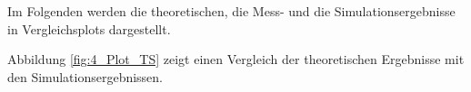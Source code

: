 \pgfmathsetmacro{\ImYtheoc}{\pgfplotsretval}
\of\dataTheoY
\pgfmathsetmacro{\ImYtheod}{\pgfplotsretval}
\of\dataTheoY
\pgfmathsetmacro{\ImYtheoe}{\pgfplotsretval}
\of\dataSimZ
\pgfmathsetmacro{\ReZsima}{\pgfplotsretval}
\of\dataSimZ
\pgfmathsetmacro{\ReZsimb}{\pgfplotsretval}
\of\dataSimZ
\pgfmathsetmacro{\ReZsimc}{\pgfplotsretval}
\of\dataSimZ
\pgfmathsetmacro{\ReZsimd}{\pgfplotsretval}
\of\dataSimZ
\pgfmathsetmacro{\ReZsime}{\pgfplotsretval}
\of\dataSimZ
\pgfmathsetmacro{\ImZsima}{\pgfplotsretval}
\of\dataSimZ
\pgfmathsetmacro{\ImZsimb}{\pgfplotsretval}
\of\dataSimZ
\pgfmathsetmacro{\ImZsimc}{\pgfplotsretval}
\of\dataSimZ
\pgfmathsetmacro{\ImZsimd}{\pgfplotsretval}
\of\dataSimZ
\pgfmathsetmacro{\ImZsime}{\pgfplotsretval}
\of\dataSimY
\pgfmathsetmacro{\ReYsima}{\pgfplotsretval}
\of\dataSimY
\pgfmathsetmacro{\ReYsimb}{\pgfplotsretval}
\of\dataSimY
\pgfmathsetmacro{\ReYsimc}{\pgfplotsretval}
\of\dataSimY
\pgfmathsetmacro{\ReYsimd}{\pgfplotsretval}
\of\dataSimY
\pgfmathsetmacro{\ReYsime}{\pgfplotsretval}
\of\dataSimY
\pgfmathsetmacro{\ImYsima}{\pgfplotsretval}
\of\dataSimY
\pgfmathsetmacro{\ImYsimb}{\pgfplotsretval}
\of\dataSimY
\pgfmathsetmacro{\ImYsimc}{\pgfplotsretval}
\of\dataSimY
\pgfmathsetmacro{\ImYsimd}{\pgfplotsretval}
\of\dataSimY
\pgfmathsetmacro{\ImYsime}{\pgfplotsretval}
%
Im Folgenden werden die theoretischen, die Mess- und die Simulationsergebnisse in Vergleichsplots dargestellt.
\par
Abbildung \ref{fig:4_Plot_TS} zeigt einen Vergleich der theoretischen Ergebnisse mit den Simulationsergebnissen.
%
